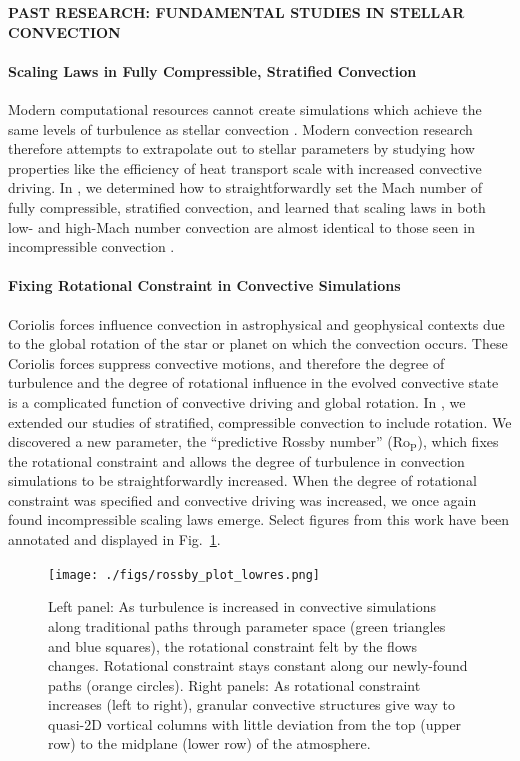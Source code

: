 \documentclass[preprint, hmargin=1in, vmargin=1in]{aastex62}
\begin{document}
\begin{center}
\textbf{PAST RESEARCH: FUNDAMENTAL STUDIES IN STELLAR CONVECTION}
\end{center}
\thispagestyle{fancy}
\paragraph{Scaling Laws in Fully Compressible, Stratified Convection}
Modern computational resources cannot create simulations which achieve the same levels of turbulence as stellar convection \citep{brummell&all2002}.
Modern convection research therefore attempts to extrapolate out to stellar parameters by studying how properties like the efficiency of heat transport scale with increased convective driving.
In \citet{anders&brown2017}, we determined how to straightforwardly set the Mach number of fully compressible, stratified convection, and learned that scaling laws in both low- and high-Mach number convection are almost identical to those seen in incompressible convection \citep{ahlers&all2009}.

\paragraph{Fixing Rotational Constraint in Convective Simulations}
Coriolis forces influence convection in astrophysical and geophysical contexts due to the global rotation of the star or planet on which the convection occurs.
These Coriolis forces suppress convective motions, and therefore the degree of turbulence and the degree of rotational influence in the evolved convective state is a complicated function of convective driving and global rotation.
In \citet{anders&all2019}, we extended our studies of stratified, compressible convection to include rotation.
We discovered a new parameter, the ``predictive Rossby number'' (Ro$_\text{P}$), which fixes the rotational constraint and allows the degree of turbulence in convection simulations to be straightforwardly increased.
When the degree of rotational constraint was specified and convective driving was increased, we once again found incompressible scaling laws emerge.
Select figures from this work have been annotated and displayed in Fig.~\ref{fig:rossby_plot}.

\begin{figure}[b]
	\begin{center}
    \texttt{[image: ./figs/rossby\_plot\_lowres.png]}
	\end{center}
	\vspace{-11pt}
    \caption{ 
	\citep[From Figs.~1 \& 2 of][]{anders&all2019} Left panel: As turbulence is increased in convective simulations along traditional paths through parameter space (green triangles and blue squares), the rotational constraint felt by the flows changes.
	Rotational constraint stays constant along our newly-found paths (orange circles).
	Right panels: As rotational constraint increases (left to right), granular convective structures give way to quasi-2D vortical columns with little deviation from the top (upper row) to the midplane (lower row) of the atmosphere.
	\label{fig:rossby_plot} }
\end{figure}
\end{document}
